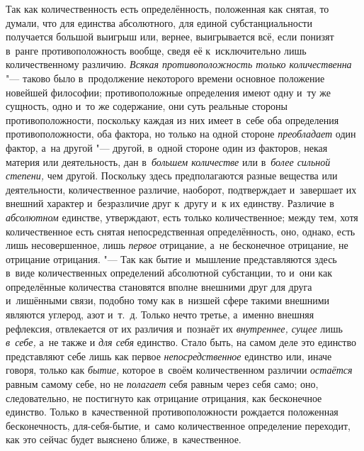 \label{bkm:bm69a}Так как количественность есть определённость, положенная как
снятая, то думали, что для единства абсолютного, для единой субстанциальности
получается большой выигрыш или, вернее, выигрывается всё, если понизят в~ранге
противоположность вообще, сведя её к~исключительно лишь количественному
различию. {\em Всякая противоположность только количественна} "--- таково было
в~продолжение некоторого времени основное положение новейшей
философии; противоположные определения
имеют одну и~ту же сущность, одно и~то же содержание, они суть реальные стороны
противоположности, поскольку каждая из них имеет в~себе оба определения
противоположности, оба фактора, но только на одной стороне {\em преобладает}
один фактор, а~на другой "--- другой, в~одной стороне один из факторов, некая
материя или деятельность, дан в~{\em большем количестве} или
в~{\em более сильной степени,} чем другой. Поскольку здесь предполагаются
разные вещества или деятельности, количественное различие, наоборот,
подтверждает и~завершает их внешний характер и~безразличие друг к~другу и~к их
единству. Различие в {\em абсолютном} единстве, утверждают, есть только
количественное; между тем, хотя количественное есть снятая непосредственная
определённость, оно, однако, есть лишь несовершенное, лишь {\em первое}
отрицание, а~не бесконечное отрицание, не отрицание отрицания. "--- Так как
бытие и~мышление представляются здесь в~виде количественных определений
абсолютной субстанции, то и~они как определённые количества становятся вполне
внешними друг для друга и~лишёнными связи, подобно тому как в~низшей сфере
такими внешними являются углерод, азот и~т.~д. Только нечто третье, а~именно
внешняя рефлексия, отвлекается от их различия и~познаёт их
{\em внутреннее, сущее} лишь {\em в~себе,} а~не также и {\em для себя}
единство. Стало быть, на самом деле это единство представляют себе лишь как
первое {\em непосредственное} единство или, иначе говоря, только как
{\em бытие,} которое в~своём количественном различии {\em остаётся} равным
самому себе, но не {\em полагает} себя равным через себя само; оно,
следовательно, не постигнуто как отрицание отрицания, как бесконечное единство.
Только в~качественной противоположности рождается положенная бесконечность,
для-себя-бытие, и~само количественное определение переходит, как это сейчас
будет выяснено ближе, в~качественное.

\bigskip

